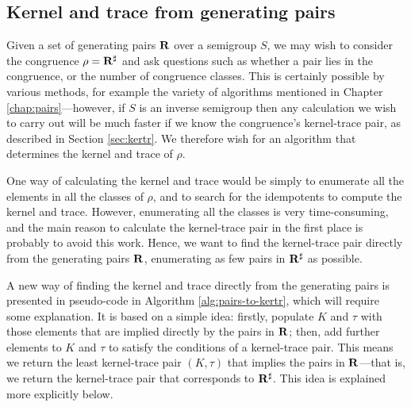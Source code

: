 \subsection{Kernel and trace from generating pairs}
\label{sec:pairs-to-kertr}

Given a set of generating pairs $\mathbf{R}$ over a semigroup $S$, we may wish
to consider the congruence $\rho = \mathbf{R}^\sharp$ and ask questions such as
whether a pair lies in the congruence, or the number of congruence classes.
This is certainly possible by various methods, for example the variety of
algorithms mentioned in Chapter \ref{chap:pairs}---however, if $S$ is an inverse
semigroup then any calculation we wish to carry out will be much faster if we
know the congruence's kernel-trace pair, as described in Section
\ref{sec:kertr}.  We therefore wish for an algorithm that determines the kernel
and trace of $\rho$.

One way of calculating the kernel and trace would be simply to enumerate all the
elements in all the classes of $\rho$, and to search for the idempotents to
compute the kernel and trace.  However, enumerating all the classes is very
time-consuming, and the main reason to calculate the kernel-trace pair in the
first place is probably to avoid this work.  Hence, we want to find the
kernel-trace pair directly from the generating pairs $\mathbf{R}$, enumerating
as few pairs in $\mathbf{R}^\sharp$ as possible.

A new way of finding the kernel and trace directly from the generating pairs is
presented in pseudo-code in Algorithm \ref{alg:pairs-to-kertr}, which will
require some explanation.  It is based on a simple idea: firstly, populate $K$
and $\tau$ with those elements that are implied directly by the pairs in
$\mathbf{R}$; then, add further elements to $K$ and $\tau$ to satisfy the
conditions of a kernel-trace pair.  This means we return the least kernel-trace
pair $(K, \tau)$ that implies the pairs in $\mathbf{R}$---that is, we return
the kernel-trace pair that corresponds to $\mathbf{R}^\sharp$.  This idea is
explained more explicitly below.

